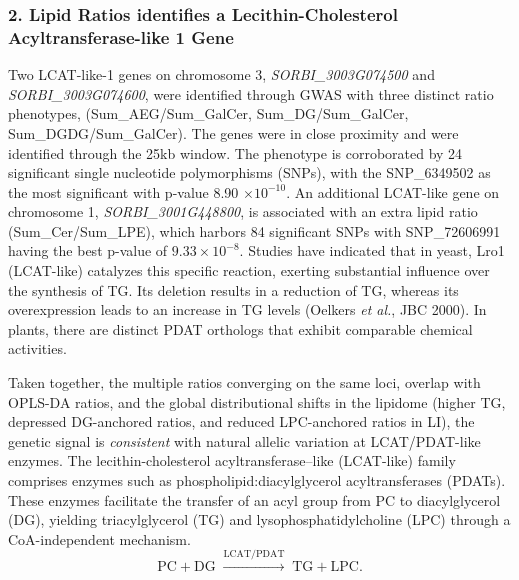 \documentclass[10pt,letterpaper]{article}
\begin{document}
\subsubsection*{2. Lipid Ratios identifies a Lecithin-Cholesterol Acyltransferase-like 1 Gene}
Two LCAT-like-1 genes on chromosome 3, \textit{SORBI\_3003G074500} and \textit{SORBI\_3003G074600}, were identified through GWAS with three distinct ratio phenotypes, (Sum\_AEG/Sum\_GalCer, Sum\_DG/Sum\_GalCer, Sum\_DGDG/Sum\_GalCer). The genes were in close proximity and were identified through the 25kb window. The phenotype is corroborated by 24 significant single nucleotide polymorphisms (SNPs), with the  SNP\_6349502 as the most significant with p-value 8.90 $\times 10^{-10}$. An additional LCAT-like gene on chromosome 1, \textit{SORBI\_3001G448800}, is associated with an extra lipid ratio (Sum\_Cer/Sum\_LPE), which harbors 84 significant SNPs with SNP\_72606991 having the best p-value of $9.33 \times 10^{-8}$. Studies have indicated that in yeast, Lro1 (LCAT-like) catalyzes this specific reaction, exerting substantial influence over the synthesis of TG. Its deletion results in a reduction of TG, whereas its overexpression leads to an increase in TG levels (Oelkers \textit{et al.}, JBC 2000). In plants, there are distinct PDAT orthologs that exhibit comparable chemical activities. 

Taken together, the multiple ratios converging on the same loci, overlap with OPLS-DA ratios, and the global distributional shifts in the lipidome (higher TG, depressed DG-anchored ratios, and reduced LPC-anchored ratios in LI), the genetic signal is \emph{consistent} with natural allelic variation at LCAT/PDAT-like enzymes. The lecithin-cholesterol acyltransferase–like (LCAT-like) family comprises enzymes such as phospholipid:diacylglycerol acyltransferases (PDATs). These enzymes facilitate the transfer of an acyl group from PC to diacylglycerol (DG), yielding triacylglycerol (TG) and lysophosphatidylcholine (LPC) through a CoA-independent mechanism.
\[
\text{PC} + \text{DG} \;\xrightarrow{\text{LCAT/PDAT}}\; \text{TG} + \text{LPC}.
\]



\end{document}
